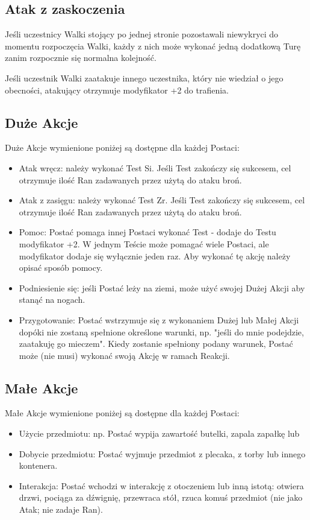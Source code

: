 \documentclass[10pt,a4paper]{book}
\begin{document}
\begin{multicols}{2}
\subsection*{Atak z zaskoczenia}
Jeśli uczestnicy Walki stojący po jednej stronie pozostawali niewykryci do momentu rozpoczęcia Walki, każdy z nich może wykonać jedną dodatkową Turę zanim rozpocznie się normalna kolejność.

Jeśli uczestnik Walki zaatakuje innego uczestnika, który nie wiedział o jego obecności, atakujący otrzymuje modyfikator +2 do trafienia.


\subsection*{Duże Akcje}
Duże Akcje wymienione poniżej są dostępne dla każdej Postaci:
\begin{itemize}
	\item Atak wręcz: należy wykonać Test Si. Jeśli Test zakończy się sukcesem, cel otrzymuje ilość Ran zadawanych przez użytą do ataku broń.
	\item Atak z zasięgu: należy wykonać Test Zr. Jeśli Test zakończy się sukcesem, cel otrzymuje ilość Ran zadawanych przez użytą do ataku broń.
	\item Pomoc: Postać pomaga innej Postaci wykonać Test - dodaje do Testu modyfikator +2. W jednym Teście może pomagać wiele Postaci, ale modyfikator dodaje się wyłącznie jeden raz. Aby wykonać tę akcję należy opisać sposób pomocy.
	\item Podniesienie się: jeśli Postać leży na ziemi, może użyć swojej Dużej Akcji aby stanąć na nogach.
	\item Przygotowanie: Postać wstrzymuje się z wykonaniem Dużej lub Małej Akcji dopóki nie zostaną spełnione określone warunki, np. "jeśli do mnie podejdzie, zaatakuję go mieczem". Kiedy zostanie spełniony podany warunek, Postać może (nie musi) wykonać swoją Akcję w ramach Reakcji.
\end{itemize}


\subsection*{Małe Akcje}
Małe Akcje wymienione poniżej są dostępne dla każdej Postaci:
\begin{itemize}
	\item Użycie przedmiotu: np. Postać wypija zawartość butelki, zapala zapałkę lub 
	\item Dobycie przedmiotu: Postać wyjmuje przedmiot z plecaka, z torby lub innego kontenera.
	\item Interakcja: Postać wchodzi w interakcję z otoczeniem lub inną istotą: otwiera drzwi, pociąga za dźwignię, przewraca stół, rzuca komuś przedmiot (nie jako Atak; nie zadaje Ran).
\end{itemize}



\end{multicols}
\end{document}
